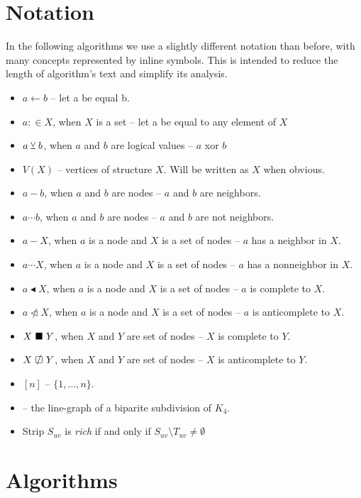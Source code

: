 \section{Notation}

In the following algorithms we use a slightly different notation than before, with many concepts represented by inline symbols. This is intended to reduce the length of algorithm's text and simplify its analysis.

\begin{itemize}
	\item $a \gets b$ -- let a be equal b.
	\item $a :\in X$, when $X$ is a set -- let a be equal to any element of $X$
	\item $a \veebar b$, when $a$ and $b$ are logical values -- $a$ xor $b$
	\item $V(X)$ -- vertices of structure $X$. Will be written as $X$ when obvious.
	\item $a - b$, when $a$ and $b$ are nodes -- $a$ and $b$ are neighbors.
	\item $a \cdots b$, when $a$ and $b$ are nodes -- $a$ and $b$ are not neighbors.
	\item $a - X$, when $a$ is a node and $X$ is a set of nodes -- $a$ has a neighbor in $X$.
	\item $a \cdots X$, when $a$ is a node and $X$ is a set of nodes -- $a$ has a nonneighbor in $X$.
	\item $a \blacktriangleleft  X$, when $a$ is a node and $X$ is a set of nodes -- $a$ is complete to $X$.
	\item $a \ntriangleleft X$, when $a$ is a node and $X$ is a set of nodes -- $a$ is anticomplete to $X$.
	\item $X \ \blacksquare\  Y$, when $X$ and $Y$ are set of nodes -- $X$ is complete to $Y$.
	\item $X \setAntiComplete Y$, when $X$ and $Y$ are set of nodes -- $X$ is anticomplete to $Y$.
	\item $[n]$  -- $\{1, \ldots, n\}$.
	\item \LGBSK -- the line-graph of a biparite subdivision of $K_4$.

	\item Strip $S_{uv}$ is \emph{rich} if and only if $S_{uv} \setminus T_{uv} \neq \emptyset$
\end{itemize}

\section{Algorithms}

